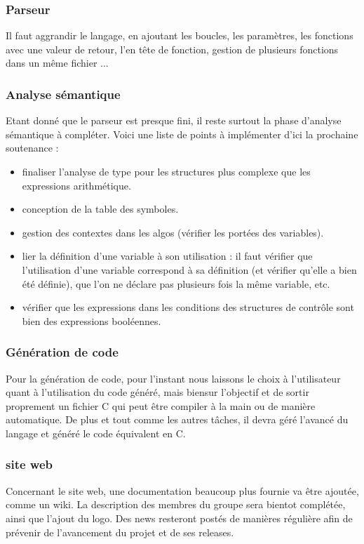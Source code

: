 \documentclass[12pt,a4paper]{report}
\begin{document}
\subsubsection{Parseur}
Il faut aggrandir le langage, en ajoutant les boucles, les paramètres, les fonctions avec une valeur de retour, l'en tête de fonction, gestion de plusieurs fonctions dans un même fichier ... 
\subsubsection{Analyse sémantique}
Etant donné que le parseur est presque fini, il reste surtout la phase d'analyse sémantique à compléter. Voici une liste de points à implémenter d'ici la prochaine soutenance :
\begin{itemize}
\item finaliser l'analyse de type pour les structures plus complexe que les expressions arithmétique.
\item conception de la table des symboles.
\item gestion des contextes dans les algos (vérifier les portées des variables).
\item lier la définition d'une variable à son utilisation : il faut vérifier que l'utilisation d'une variable correspond à sa définition (et vérifier qu'elle a bien été définie), que l'on ne déclare pas plusieurs fois la même variable, etc.
\item vérifier que les expressions dans les conditions des structures de contrôle sont bien des expressions booléennes.
\end{itemize}
\subsubsection{Génération de code}
Pour la génération de code, pour l'instant nous laissons le choix à l'utilisateur quant à l'utilisation du code généré, mais biensur l'objectif et de sortir proprement un fichier C qui peut être compiler à la main ou de manière automatique. De plus et tout comme les autres tâches, il devra géré l'avancé du langage et généré le code équivalent en C.
\subsubsection{site web}

Concernant le site web, une documentation beaucoup plus fournie va être ajoutée, comme un wiki. La description des membres du groupe sera bientot complétée, ainsi que l'ajout du logo. Des news resteront postés de manières régulière afin de prévenir de l'avancement du projet et de ses releases.
\newpage
\end{document}
